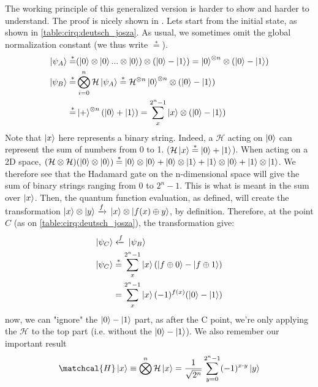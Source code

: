 The working principle of this generalized version is harder to show and harder to understand. The proof is nicely shown in \cite{noauthor_deutschjozsa_2022}.
Lets start from the initial state, as shown in \autoref{table:cirq:deutsch_josza}. As usual, we sometimes omit the global normalization constant 
(we thus write $\stackrel{*}{=}$).
\begin{align}
  \ket{\psi_A}\stackrel{*}{=}& (\ket{0}\otimes \ket{0} ... \otimes \ket{0})\otimes (\ket{0}-\ket{1}) = \ket{0}^{\otimes n}\otimes (\ket{0}-\ket{1})\\
  \ket{\psi_B}\stackrel{*}{=}& \bigotimes_{i=0}^{n} \mathcal{H} \ket{\psi_A} \stackrel{*}{=} \mathcal{H}^{\otimes n}\ket{0}^{\otimes n}\otimes (\ket{0}-\ket{1})\\
  \stackrel{*}{=}& \ket{+}^{\otimes n} (\ket{0}+\ket{1}) = \sum_{x}^{2^n-1} \ket{x}\otimes (\ket{0}-\ket{1})
\end{align}
Note that $\ket{x}$ here represents a binary string. Indeed, a $\mathcal{H}$ acting on $\ket{0}$ can represent the sum of numbers from 0 to 1. 
($\mathcal{H}\ket{x}\stackrel{*}{=}\ket{0}+\ket{1}$). When acting on a 2D space, 
$(\mathcal{H}\otimes \mathcal{H})(\ket{0}\otimes \ket{0})\stackrel{*}{=}\ket{0}\otimes \ket{0} + \ket{0}\otimes \ket{1} + \ket{1}\otimes \ket{0} + \ket{1}\otimes \ket{1}$.
We therefore see that the Hadamard gate on the n-dimensional space will give the sum of binary strings ranging from $0$ to $2^n-1$. This is what is meant 
in the sum over $\ket{x}$.
Then, the quantum function evaluation, as defined, will create the transformation $\ket{x}\otimes \ket{y} \xrightarrow{f}{} \ket{x}\otimes \ket{f(x)\oplus y}$,
by definition.
Therefore, at the point $C$ (as on \autoref{table:cirq:deutsch_josza}), the transformation give:
\begin{align}
  \ket{\psi_C} &\xleftarrow{f}{} \ket{\psi_B} \\
  \ket{\psi_C} &\stackrel{*}{=} \sum_x^{2^n-1} \ket{x}(\ket{f\oplus 0}-\ket{f \oplus 1}) \\
               &= \sum_x^{2^n-1} \ket{x}(-1)^{f(x)} (\ket{0}-\ket{1})
\label{eq:deutsch_josza_C}
\end{align}
now, we can "ignore" the $\ket{0}-\ket{1}$ part, as after the C point, we're only applying the $\mathcal{H}$ to the top part (i.e. without the 
$\ket{0}-\ket{1}$). We also remember our important result 
\begin{align}
  \matchcal{H} \ket{x} \equiv \bigotimes^n \mathcal{H} \ket{x} = \frac{1}{\sqrt{2^n}} \sum_{y=0}^{2^n-1} (-1)^{x\cdot y}\ket{y}
  \label{eq:hadamard_on_generic}
\end{align}
